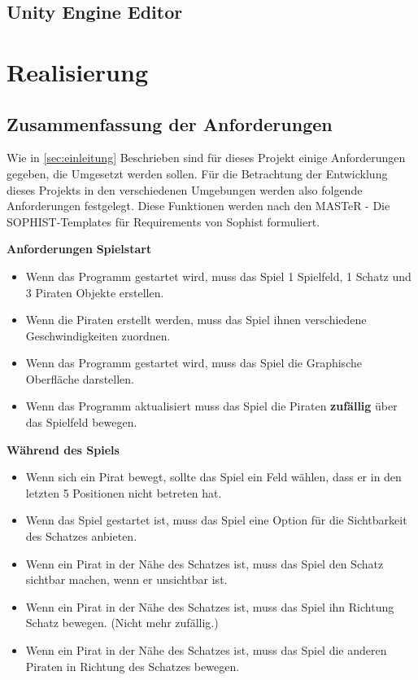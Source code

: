 \documentclass[
	12pt, %
	a4paper,
	listof=totoc, %
	bibliography=totoc, %
	numbers=noenddot, %
	ngerman, %
	headsepline, %
	oneside %
	]{scrbook} %
\begin{document}
\section{Unity Engine Editor}



\chapter{Realisierung}\label{sec:Realisierung}
\section{Zusammenfassung der Anforderungen}
Wie in \ref{sec:einleitung} Beschrieben sind für dieses Projekt einige Anforderungen gegeben, die Umgesetzt werden sollen. Für die Betrachtung der Entwicklung dieses Projekts in den verschiedenen Umgebungen werden also folgende Anforderungen festgelegt.
Diese Funktionen werden nach den \glqq MASTeR - Die SOPHIST-Templates für Requirements\grqq{} von Sophist formuliert\cite{sophist}.

\textbf{Anforderungen}
\textbf{Spielstart}
\begin{itemize}\vspace{-1em}
\setlength{\itemsep}{-1em}
	\item Wenn das Programm gestartet wird, muss das Spiel 1 Spielfeld, 1 Schatz und 3 Piraten Objekte erstellen.
	\item Wenn die Piraten erstellt werden, muss das Spiel ihnen verschiedene Geschwindigkeiten zuordnen.
	\item Wenn das Programm gestartet wird, muss das Spiel die Graphische Oberfläche darstellen.
	\item Wenn das Programm aktualisiert muss das Spiel die Piraten \textbf{zufällig} über das Spielfeld bewegen.
\end{itemize}

\textbf{Während des Spiels}
\begin{itemize}\vspace{-1em}
\setlength{\itemsep}{-1em}
	\item Wenn sich ein Pirat bewegt, sollte das Spiel ein Feld wählen, dass er in den letzten 5 Positionen nicht betreten hat.
	\item Wenn das Spiel gestartet ist, muss das Spiel eine Option für die Sichtbarkeit des Schatzes anbieten.
	\item Wenn ein Pirat in der Nähe des Schatzes ist, muss das Spiel den Schatz sichtbar machen, wenn er unsichtbar ist.
	\item Wenn ein Pirat in der Nähe des Schatzes ist, muss das Spiel ihn Richtung Schatz bewegen. (Nicht mehr zufällig.)
	\item Wenn ein Pirat in der Nähe des Schatzes ist, muss das Spiel die anderen Piraten in Richtung des Schatzes bewegen.
\end{itemize}
\end{document}
